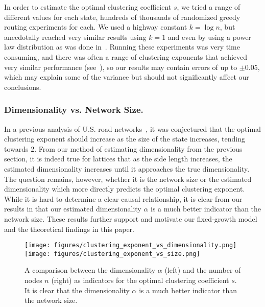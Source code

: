 In order to estimate the optimal clustering coefficient $s$, we tried a range of
different values for each state, hundreds of thousands of randomized greedy
routing experiments for each.
We used a highway constant $k = \log{n}$, but anecdotally reached very similar
results using $k = 1$ and even by using a power law distribution as was done
in~\cite{goodrich2022modeling}.
Running these experiments was very time consuming, and there was often a range
of clustering exponents that achieved very similar performance
(see~\cite{goodrich2022modeling}), so our results may contain errors of up to
$\pm 0.05$, which may explain some of the variance but should not significantly
affect our conclusions.

\subsubsection{Dimensionality vs. Network Size.}
%
In a previous analysis of U.S. road networks~\cite{goodrich2022modeling}, it was
conjectured that the optimal clustering exponent should increase as the size of
the state increases, tending towards 2.
From our method of estimating dimensionality from the previous section, it is
indeed true for lattices that as the side length increases, the estimated
dimensionality increases until it approaches the true dimensionality.
The question remains, however, whether it is the network size or the estimated
dimensionality which more directly predicts the optimal clustering exponent.
While it is hard to determine a clear causal relationship, it is clear from our
results in  that our estimated dimensionality
$\alpha$ is a much better indicator than the network size.
These results further support and motivate our fixed-growth model and the
theoretical findings in this paper.

\begin{figure}[h!]
	\centering
	\texttt{[image: figures/clustering\_exponent\_vs\_dimensionality.png]}
	\hfill
	\texttt{[image: figures/clustering\_exponent\_vs\_size.png]}
	\vspace*{-\medskipamount}
	\caption{
		A comparison between the dimensionality $\alpha$ (left) and
		the number of nodes $n$ (right) as indicators for the optimal clustering
		coefficient $s$.
		It is clear that the dimensionality $\alpha$ is a much better indicator
		than the network size.
		\label{fig:indicator_comparison}
	}
\end{figure}
